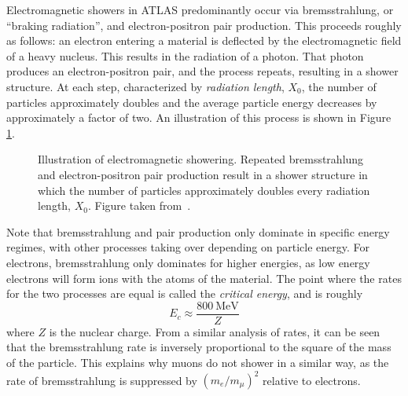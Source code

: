 Electromagnetic showers in ATLAS predominantly occur via bremsstrahlung, or ``braking radiation'', and electron-positron 
pair production. This proceeds roughly as follows: an electron entering a material is deflected by the electromagnetic 
field of a heavy nucleus. This results in the radiation of a photon. That photon produces an electron-positron 
pair, and the process repeats, resulting in a shower structure. At each step, characterized by 
\emph{radiation length}, $X_{0}$, the number of particles approximately doubles and the average particle 
energy decreases by approximately a factor of two. An illustration of this process is shown in 
Figure \ref{fig:em-shower}.

\begin{figure}[ht]
\centering
{}
\caption{\label{fig:em-shower} Illustration of electromagnetic showering. Repeated bremsstrahlung and 
electron-positron pair production result in a shower structure in which the number of particles 
approximately doubles every radiation length, $X_{0}$. Figure taken from~\cite{Thomson}.}
\end{figure}

Note that bremsstrahlung and pair production only dominate in specific energy regimes, with other processes 
taking over depending on particle energy. For electrons, bremsstrahlung only dominates for higher energies,  
as low energy electrons will form ions with the atoms of the material. The point where the rates for the 
two processes are equal is called the \emph{critical energy}, and is roughly
\begin{equation}
E_{c} \approx \frac{\SI{800}{\MeV}}{Z}
\end{equation}
where $Z$ is the nuclear charge. From a similar analysis of rates, it can be seen that the bremsstrahlung 
rate is inversely proportional to the square of the mass of the particle. This explains why muons do not 
shower in a similar way, as the rate of bremsstrahlung is suppressed by $(m_{e}/m_{\mu})^2$ relative to electrons.

